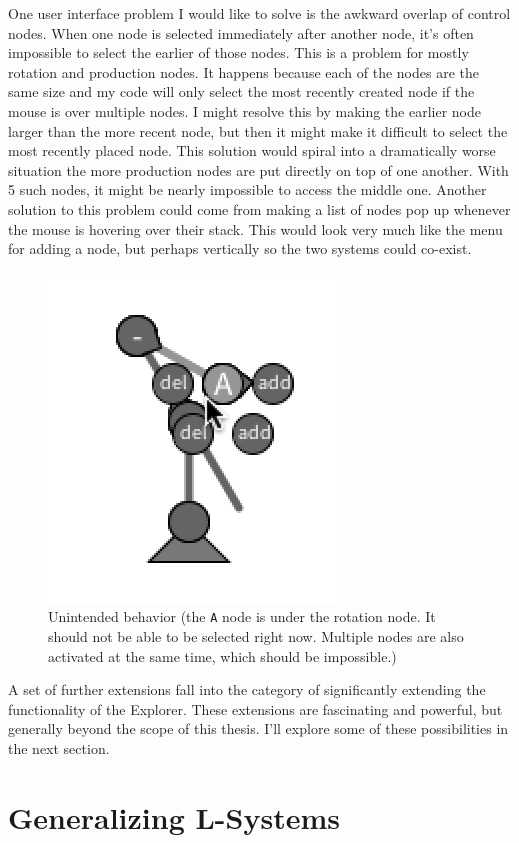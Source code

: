 \documentclass[12pt,twoside]{reedthesis}
\newcommand{\code}[1]{\texttt{#1}}
\begin{document}
	One user interface problem I would like to solve is the awkward overlap of control nodes. When one node is selected immediately after another node, it's often impossible to select the earlier of those nodes. This is a problem for mostly rotation and production nodes. It happens because each of the nodes are the same size and my code will only select the most recently created node if the mouse is over multiple nodes. I might resolve this by making the earlier node larger than the more recent node, but then it might make it difficult to select the most recently placed node. This solution would spiral into a dramatically worse situation the more production nodes are put directly on top of one another. With 5 such nodes, it might be nearly impossible to access the middle one. Another solution to this problem could come from making a list of nodes pop up whenever the mouse is hovering over their stack. This would look very much like the menu for adding a node, but perhaps vertically so the two systems could co-exist.
	
	\begin{figure}[h]
	\centering
	\includegraphics[height = 0.4\linewidth]{Images/BuggyBehavior}
	\caption[Unintended Behavior]{Unintended behavior (the \code{A} node is under the rotation node. It should not be able to be selected right now. Multiple nodes are also activated at the same time, which should be impossible.)}
	\label{Buggy}
	\end{figure}
	
	A set of further extensions fall into the category of significantly extending the functionality of the Explorer. These extensions are fascinating and powerful, but generally beyond the scope of this thesis. I'll explore some of these possibilities in the next section.

\section{Generalizing L-Systems}
\label{Generalizations}
\end{document}
